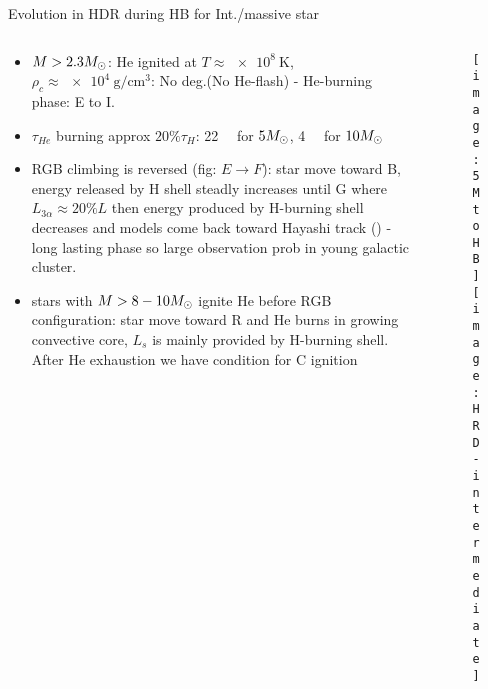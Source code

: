 \begin{frame}{Evolution in HDR during HB for Int./massive star}
\begin{columns}[T]
	\begin{column}{0.55\textwidth}
	\begin{itemize}
        \item $M>2.3M_{\odot}$: He ignited at $T\approx\SI{e8}{\kelvin}$, $\rho_c\approx\SI{e4}{\gram\per\cubic\cm}$: No \Pelectron deg.(No He-flash) - He-burning phase: E to I.
        \item $\tau_{He}$ burning approx $20\%\tau_H$: \SI{22}{\mega\year} for $5M_{\odot}$, \SI{4}{\mega\year} for $10M_{\odot}$
	\item RGB climbing is reversed (fig: $E\to F$): star move toward B, energy released by H shell steadly increases until G where $L_{3\alpha}\approx20\%L$ then energy produced by H-burning shell decreases and models come back toward Hayashi track () - long lasting phase so large observation prob in young galactic cluster.
    \item stars with $M>8-10M_{\odot}$ ignite He before RGB configuration: star move toward R and He burns in growing convective core, $L_s$ is mainly provided by H-burning shell.  After He exhaustion we have condition for C ignition
	\end{itemize}
	\end{column}
	\begin{column}{0.45\textwidth}
	\begin{figure}[!ht]
	\texttt{[image: 5MtoHB]}\label{fig:5MtoHB}
	\texttt{[image: HRD-intermediate]}\label{fig:HRD-intermediate}
	\end{figure}
\end{column}\end{columns}
\end{frame}

